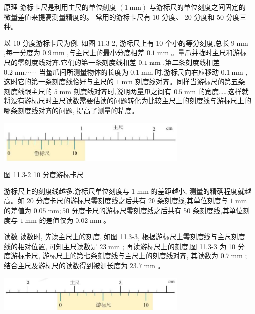 \documentclass[10pt]{article}
\begin{document}
原理 游标卡尺是利用主尺的单位刻度 \(\left( {1\mathrm{\;{mm}}}\right)\) 与游标尺的单位刻度之间固定的微量差值来提高测量精度的。 常用的游标卡尺有 10 分度、 20 分度和 50 分度三种。

以 10 分度游标卡尺为例, 如图 11.3-2, 游标尺上有 10 个小的等分刻度,总长 \(9\mathrm{\;{mm}}\) ,每一分度为 \({0.9}\mathrm{\;{mm}}\) ,与主尺上的最小分度相差 \({0.1}\mathrm{\;{mm}}\) 。量爪并拢时主尺和游标尺的零刻度线对齐,它们的第一条刻度线相差 \({0.1}\mathrm{\;{mm}}\) ,第二条刻度线相差 \({0.2}\mathrm{\;{mm}}\cdots \cdots\) 当量爪间所测量物体的长度为 \({0.1}\mathrm{\;{mm}}\) 时,游标尺向右应移动 \({0.1}\mathrm{\;{mm}}\) ,这时它的第一条刻度线恰好与主尺的 \(1\mathrm{\;{mm}}\) 刻度线对齐。同样当游标尺的第五条刻度线跟主尺的 \(5\mathrm{\;{mm}}\) 刻度线对齐时,说明两量爪之间有 \({0.5}\mathrm{\;{mm}}\) 的宽度……这样就将没有游标尺时主尺读数需要估读的问题转化为比较主尺上的刻度线与游标尺上的哪条刻度线对齐的问题, 提高了测量的精度。

\begin{center}
\includegraphics[max width=0.7\textwidth]{images/01911d5f-8e38-70c0-b5b8-2b399bd115b6_68_186934.jpg}
\end{center}

图 11.3-2 10 分度游标卡尺

游标尺上的刻度线越多,游标尺单位刻度与 \(1\mathrm{\;{mm}}\) 的差距越小, 测量的精确程度就越高。如 20 分度卡尺的游标尺零刻度线之后共有 20 条刻度线,其单位刻度与 \(1\mathrm{\;{mm}}\) 的差值为 \({0.05}\mathrm{\;{mm}};{50}\) 分度卡尺的游标尺零刻度线之后共有 50 条刻度线,其单位刻度与 \(1\mathrm{\;{mm}}\) 的差值仅为 \({0.02}\mathrm{\;{mm}}\) 。

读数 读数时, 先读主尺上的刻度, 如图 11.3-3, 根据游标尺上零刻度线与主尺刻度线的相对位置, 可知主尺读数是 \({23}\mathrm{\;{mm}}\) ; 再读游标尺上的刻度,图 11.3-3 为 10 分度游标卡尺, 游标尺上的第七条刻度线与主尺上的刻度线对齐, 其读数为 \({0.7}\mathrm{\;{mm}}\) ; 结合主尺及游标尺的读数得到被测长度为 \({23.7}\mathrm{\;{mm}}\) 。

\begin{center}
\includegraphics[max width=0.7\textwidth]{images/01911d5f-8e38-70c0-b5b8-2b399bd115b6_68_975060.jpg}
\end{center}
\end{document}
